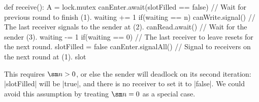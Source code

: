 \begin{answerI}
\begin{scala}
{  def receive(): A = lock.mutex{
    canEnter.await(slotFilled == false) // Wait for previous round to finish (1).
    waiting += 1
    if(waiting == n) 
      canWrite.signal() // The last receiver signals to the sender at (2).
    canRead.await() // Wait for the sender (3).
    waiting -= 1
    if(waiting == 0){ // The last receiver to leave resets for the next round.
      slotFilled = false 
      canEnter.signalAll() // Signal to receivers on the next round at (1).
    }
    slot
  }
}
\end{scala}
%
This requires $\sm n > 0$, or else the sender will deadlock on its second
iteration: |slotFilled| will be |true|, and there is no receiver to set it to
|false|.  We could avoid this assumption by treating $\sm n = 0$ as a special
case.
\end{answerI}

